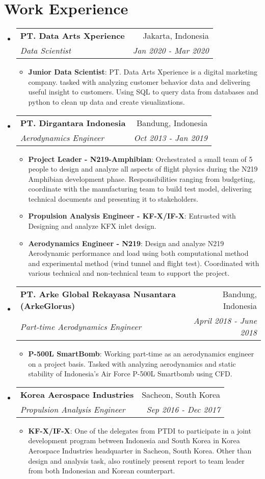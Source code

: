 \documentclass[a4paper,11pt]{article}
\makeatletter
\newcommand{\resumeItem}[2]{
  \item\small{
    \textbf{#1}{: #2 \vspace{-2pt}}
  }
}
\newcommand{\resumeSubheading}[4]{
  \vspace{-1pt}\item
    \begin{tabular*}{0.97\textwidth}[t]{l@{\extracolsep{\fill}}r}
      \textbf{#1} & #2 \\
      \textit{\small#3} & \textit{\small #4} \\
    \end{tabular*}\vspace{-3pt}
}
\newcommand{\resumeSubHeadingListStart}{\begin{itemize}[leftmargin=*]}
\newcommand{\resumeSubHeadingListEnd}{\end{itemize}}
\newcommand{\resumeItemListStart}{\begin{itemize}}
\newcommand{\resumeItemListEnd}{\end{itemize}\vspace{-2pt}}
\makeatother
\begin{document}
\section{Work Experience}
  \resumeSubHeadingListStart
  \resumeSubheading
      {PT. Data Arts Xperience}{Jakarta, Indonesia}
      {Data Scientist}{Jan 2020 - Mar 2020}
      \resumeItemListStart
        \resumeItem
          {Junior Data Scientist}{PT. Data Arts Xperience is a digital marketing company. tasked with analyzing customer behavior data and delivering useful insight to customers. Using SQL to query data from databases and python to clean up data and create visualizations.}
      \resumeItemListEnd
    \resumeSubheading
      {PT. Dirgantara Indonesia}{Bandung, Indonesia}
      {Aerodynamics Engineer}{Oct 2013 - Jan 2019}
      \resumeItemListStart
        \resumeItem{Project Leader - N219-Amphibian}
          {Orchestrated a small team of 5 people to design and analyze all aspects of flight physics during the N219 Amphibian development phase. Responsibilities ranging from budgeting, coordinate with the manufacturing team to build test model, delivering technical documents and presenting it to stakeholders.}
        \resumeItem{Propulsion Analysis Engineer - KF-X/IF-X}
          {Entrusted with Designing and analyze KFX inlet design. }
        \resumeItem{Aerodynamics Engineer - N219}
          {Design and analyze N219 Aerodynamic performance and load using both computational method and experimental method (wind tunnel and flight test). Coordinated with various technical and non-technical team to support the project.}
      \resumeItemListEnd
    \resumeSubheading
      {PT. Arke Global Rekayasa Nusantara (ArkeGlorus)}{Bandung, Indonesia}
      {Part-time Aerodynamics Engineer}{April 2018 - June 2018}
      \resumeItemListStart
        \resumeItem{P-500L SmartBomb}
          {Working part-time as an aerodynamics engineer on a project basis. Tasked with analyzing aerodynamics and static stability of Indonesia's Air Force P-500L Smartbomb using CFD.}
      \resumeItemListEnd
    \resumeSubheading
      {Korea Aerospace Industries}{Sacheon, South Korea}
      {Propulsion Analysis Engineer}{Sep 2016 - Dec 2017}
      \resumeItemListStart
        \resumeItem{KF-X/IF-X}
          {One of the delegates from PTDI to participate in a joint development program between Indonesia and South Korea in Korea Aerospace Industries headquarter in Sacheon, South Korea. Other than design and analysis task, also routinely present report to team leader from both Indonesian and Korean counterpart.}
      \resumeItemListEnd
  \resumeSubHeadingListEnd
\end{document}
